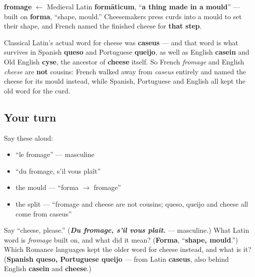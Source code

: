 \begin{cousinweb}
\textbf{fromage} $\leftarrow$ Medieval Latin \textbf{formāticum}, \textquotedblleft{}\textbf{a thing made in a mould}\textquotedblright{} — built on \textbf{forma}, \textquotedblleft{}shape, mould.\textquotedblright{} Cheesemakers press curds into a mould to set their shape, and French named the finished cheese for \textbf{that step}.

Classical Latin's actual word for cheese was \textbf{caseus} — and that word is what survives in Spanish \textbf{queso} and Portuguese \textbf{queijo}, as well as English \textbf{casein} and Old English \textbf{cyse}, the ancestor of \textbf{cheese} itself. So French \emph{fromage} and English \emph{cheese} are \textbf{not} cousins: French walked away from \emph{caseus} entirely and named the cheese for its mould instead, while Spanish, Portuguese and English all kept the old word for the curd.
\end{cousinweb}

\subsection*{Your turn}
Say these aloud:

\begin{itemize}
\raggedright
  \item \textquotedblleft{}le fromage\textquotedblright{} — masculine
  \item \textquotedblleft{}du fromage, s'il vous plaît\textquotedblright{}
  \item the mould — \textquotedblleft{}forma $\to$ fromage\textquotedblright{}
  \item the split — \textquotedblleft{}fromage and cheese are not cousins; queso, queijo and cheese all come from caseus\textquotedblright{}
\end{itemize}

\begin{tcolorbox}[breakable,colback=teal!4,colframe=teal!35!black,title={Before you move on}]
Say \textquotedblleft{}cheese, please.\textquotedblright{} (\emph{\textbf{Du fromage, s'il vous plaît.}} — masculine.) What Latin word is \emph{fromage} built on, and what did it mean? (\textbf{Forma}, \textquotedblleft{}\textbf{shape, mould}.\textquotedblright{}) Which Romance languages kept the older word for cheese instead, and what is it? (\textbf{Spanish queso, Portuguese queijo} — from Latin \textbf{caseus}, also behind English \textbf{casein} and \textbf{cheese}.)
\end{tcolorbox}

